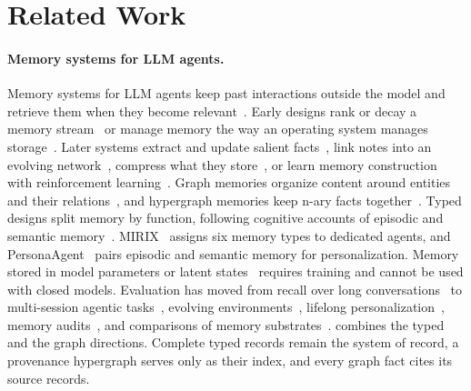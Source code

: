 \section{Related Work}
\label{sec:related}

\paragraph{Memory systems for LLM agents.}
Memory systems for LLM agents keep past interactions outside the model and
retrieve them when they become
relevant~\citep{agentmemorysurvey,zhang2024memorysurvey,lscs,guo2026multimodalmemory}.
Early designs rank or decay a memory stream~\citep{park2023generative,MemoryBank}
or manage memory the way an operating system manages
storage~\citep{memgpt,memoryos,li2025memos}. Later systems extract and update
salient facts~\citep{mem0}, link notes into an evolving network~\citep{amem},
compress what they store~\citep{fang2026lightmem,liu2026simplemem}, or learn
memory construction with reinforcement
learning~\citep{wang2025memalpha,yan2026memoryr1}. Graph memories organize
content around entities and their
relations~\citep{bei2025graphsagents,zep,gutierrez2024hipporag,gutierrez2025hipporag2,edge2024graphrag,wu2026gam},
and hypergraph memories keep n-ary facts
together~\citep{luo2025hypergraphrag,hypermem}. Typed designs split memory by
function, following cognitive accounts of episodic and semantic
memory~\citep{tulving1985memory,episodic_memory_missing_piece}.
MIRIX~\citep{mirix} assigns six memory types to dedicated agents, and
PersonaAgent~\citep{zhang2026personaagent} pairs episodic and semantic memory
for personalization. Memory stored in model parameters or latent
states~\citep{memoryllm,mplus,self-param,behrouz2024titans} requires training
and cannot be used with closed models. Evaluation has moved from recall over
long conversations~\citep{locomo,longmemeval} to multi-session agentic
tasks~\citep{memoryagentbench,he2026memoryarena}, evolving
environments~\citep{ji2026clawarena}, lifelong
personalization~\citep{memorycd}, memory audits~\citep{ma2026memaudit}, and
comparisons of memory substrates~\citep{harnessmemory}. \ours combines the
typed and the graph directions. Complete typed records remain the system of
record, a provenance hypergraph serves only as their index, and every graph
fact cites its source records.

